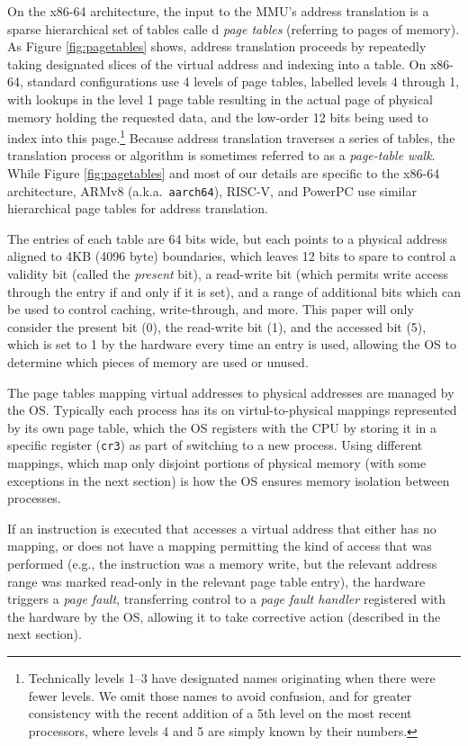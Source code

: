 On the x86-64 architecture, the input to the \textsc{MMU}'s address translation is a sparse hierarchical set of tables calle d \emph{page tables} (referring to pages of memory). As Figure \ref{fig:pagetables} shows, address translation proceeds by repeatedly taking designated slices of the virtual address and indexing into a table. On x86-64, standard configurations use 4 levels of page tables, labelled levels 4 through 1, with lookups in the level 1 page table resulting in the actual page of physical memory holding the requested data, and the low-order 12 bits being used to index into this page.\footnote{Technically levels 1--3 have designated names originating when there were fewer levels. We omit those names to avoid confusion, and for greater consistency with the recent addition of a 5th level on the most recent processors, where levels 4 and 5 are simply known by their numbers.}  Because address translation traverses a series of tables, the translation process or algorithm is sometimes referred to as a \emph{page-table walk}. While Figure \ref{fig:pagetables} and most of our details are specific to the x86-64 architecture, ARMv8 (a.k.a.\ \texttt{aarch64}), RISC-V, and PowerPC use similar hierarchical page tables for address translation.

The entries of each table are 64 bits wide, but each points to a physical address aligned to 4KB (4096 byte) boundaries, which leaves 12 bits to spare to control a validity bit (called the \emph{present} bit), a read-write bit (which permits write access through the entry if and only if it is set), and a range of additional bits which can be used to control caching, write-through, and more. This paper will only consider the present bit (0), the read-write bit (1), and the accessed bit (5), which is set to 1 by the hardware every time an entry is used, allowing the OS to determine which pieces of memory are used or unused.

The page tables mapping virtual addresses to physical addresses are managed by the OS. Typically each process has its on virtul-to-physical mappings represented by its own page table, which the OS registers with the CPU by storing it in a specific register (\texttt{cr3}) as part of switching to a new process. Using different mappings, which map only disjoint portions of physical memory (with some exceptions in the next section) is how the OS ensures memory isolation between processes.

If an instruction is executed that accesses a virtual address that either has no mapping, or does not have a mapping permitting the kind of access that was performed (e.g., the instruction was a memory write, but the relevant address range was marked read-only in the relevant page table entry), the hardware triggers a \emph{page fault}, transferring control to a \emph{page fault handler} registered with the hardware by the OS, allowing it to take corrective action (described in the next section).

